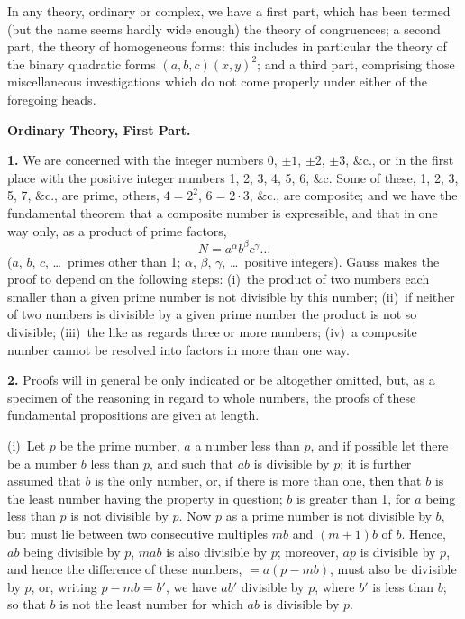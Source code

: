 \documentclass[11pt,a4paper]{article}
\begin{document}
In any theory, ordinary or complex, we have a first part, which has been termed (but the name seems hardly wide enough) the theory of congruences; a second part, the theory of homogeneous forms: this includes in particular the theory of the binary quadratic forms $(a, b, c)(x, y)^{2}$; and a third part, comprising those miscellaneous investigations which do not come properly under either of the foregoing heads.

\bigskip
\noindent\textbf{Ordinary Theory, First Part.}

\smallskip

\textbf{1.}\quad
We are concerned with the integer numbers $0$, $\pm 1$, $\pm 2$, $\pm 3$, \&c., or in the first place with the positive integer numbers 1, 2, 3, 4, 5, 6, \&c. Some of these, 1, 2, 3, 5, 7, \&c., are prime, others, $4 = 2^{2}$, $6 = 2 \cdot 3$, \&c., are composite; and we have the fundamental theorem that a composite number is expressible, and that in one way only, as a product of prime factors,
\[
N = a^{\alpha} b^{\beta} c^{\gamma} \ldots
\]
($a$, $b$, $c$, \ldots\ primes other than 1; $\alpha$, $\beta$, $\gamma$, \ldots\ positive integers). Gauss makes the proof to depend on the following steps: (i)~the product of two numbers each smaller than a given prime number is not divisible by this number; (ii)~if neither of two numbers is divisible by a given prime number the product is not so divisible; (iii)~the like as regards three or more numbers; (iv)~a composite number cannot be resolved into factors in more than one way.

\textbf{2.}\quad
Proofs will in general be only indicated or be altogether omitted, but, as a specimen of the reasoning in regard to whole numbers, the proofs of these fundamental propositions are given at length.

(i)~Let $p$ be the prime number, $a$ a number less than $p$, and if possible let there be a number $b$ less than $p$, and such that $ab$ is divisible by $p$; it is further assumed that $b$ is the only number, or, if there is more than one, then that $b$ is the least number having the property in question; $b$ is greater than 1, for $a$ being less than $p$ is not divisible by $p$. Now $p$ as a prime number is not divisible by $b$, but must lie between two consecutive multiples $mb$ and $(m + 1)b$ of $b$. Hence, $ab$ being divisible by $p$, $mab$ is also divisible by $p$; moreover, $ap$ is divisible by $p$, and hence the difference of these numbers, $= a(p - mb)$, must also be divisible by $p$, or, writing $p - mb = b'$, we have $ab'$ divisible by $p$, where $b'$ is less than $b$; so that $b$ is not the least number for which $ab$ is divisible by $p$.
\end{document}
